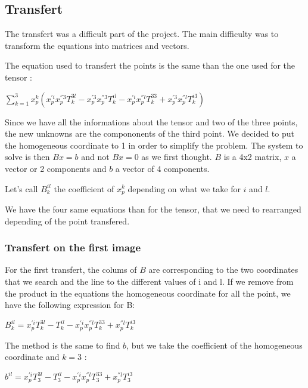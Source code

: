 \documentclass{report}
\begin{document}
\subsection{Transfert}
The transfert was a difficult part of the project. The main difficulty was to transform the equations into matrices and vectors.

The equation used to transfert the points is the same than the one used for the tensor : 
\begin{center}
 $ \displaystyle { \sum_{k = 1}^{3}} x_{p}^{k}(x_{p}^{'i}x_{p}^{''3}T_{k}^{3l} - x_{p}^{'3}x_{p}^{''3}T_{k}^{il} - x_{p}^{'i}x_{p}^{''l}T_{k}^{33} + x_{p}^{'3}x_{p}^{''l}T_{k}^{i3})$ 
\end{center}

Since we have all the informations about the tensor and two of the three points, the new unknowns are the compononents of the third point. We decided to put the homogeneous coordinate to 1 in order to simplify the problem. The system to solve is then $Bx=b$ and not $Bx=0$ as we first thought. $B$ is a 4x2 matrix, $x$ a vector or 2 components and $b$ a vector of 4 components. 

Let's call $B_{k}^{il}$ the coefficient of $x_{p}^{k}$ depending on what we take for $i$ and $l$. 

We have the four same equations than for the tensor, that we need to rearranged depending of the point transfered.


\subsubsection{Transfert on the first image}
For the first transfert, the colums of $B$ are corresponding to the two coordinates that we search and the line to the different values of i and l. If we remove from the product in the equations the homogeneous coordinate for all the point, we have the following expression for B:

\begin{center}
$B_{k}^{il} = x_{p}^{'i}T_{k}^{3l} - T_{k}^{il} - x_{p}^{'i}x_{p}^{''l}T_{k}^{33} + x_{p}^{''l}T_{k}^{i3}$
\end{center}

The method is the same to find $b$, but we take the coefficient of the homogeneous coordinate and $k=3$ : 

\begin{center}
$b^{il} = x_{p}^{'i}T_{3}^{3l} - T_{3}^{il} - x_{p}^{'i}x_{p}^{''l}T_{3}^{33} + x_{p}^{''l}T_{3}^{i3}$
\end{center}
\end{document}
